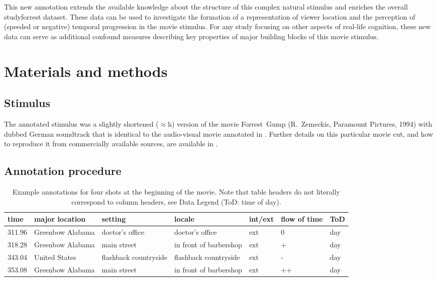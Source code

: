 \documentclass[10pt,a4paper]{article}
\begin{document}
\begin{multicols}{2}
This new annotation extends the available knowledge about the structure of this
complex natural stimulus and enriches the overall studyforrest dataset. These
data can be used to investigate the formation of a representation of viewer
location and the perception of (speeded or negative) temporal progression in
the movie stimulus. For any study focusing on other aspects of real-life
cognition, these new data can serve as additional confound measures describing
key properties of major building blocks of this movie stimulus.


\section*{Materials and methods}

\subsection*{Stimulus}

The annotated stimulus was a slightly shortened ($\approx$\unit[2]{h}) version
of the movie Forrest~Gump (R.~Zemeckis, Paramount Pictures, 1994) with dubbed
German soundtrack that is identical to the audio-visual movie annotated in
\cite{LRS+2015}. Further details on this particular movie cut, and how to
reproduce it from commercially available sources, are available in
\cite{HAK+16}.


\subsection*{Annotation procedure}

\begin{table*}[t]
\caption{Example annotations for four shots at the beginning of the movie. Note
that table headers do not literally correspond to column headers, see Data Legend
(ToD: time of day).}
\label{tab:example}
\begin{tabular}{lllllll}
\toprule
\textbf{time} & \textbf{major location} & \textbf{setting} & \textbf{locale} & \textbf{int/ext} & \textbf{flow of time} & \textbf{ToD}\\
\midrule
311.96  & Greenbow Alabama  & doctor's office  & doctor's office  & ext  & 0 & day\tabularnewline
318.28  & Greenbow Alabama  & main street  & in front of barbershop  & ext  & + & day\tabularnewline
343.04  & United States  & flashback countryside  & flashback countryside  & ext  & - & day\tabularnewline
353.08 & Greenbow Alabama  & main street  & in front of barbershop  & ext  & ++ & day\tabularnewline
\bottomrule
\end{tabular}
\end{table*}



\end{multicols}
\end{document}
